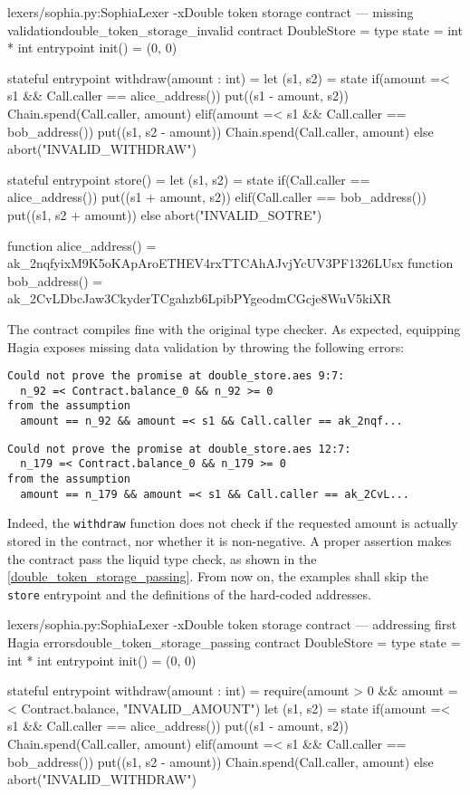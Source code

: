\begin{code}[H]{lexers/sophia.py:SophiaLexer -x}{Double token storage contract --- missing
    validation}{double_token_storage_invalid}
contract DoubleStore =
  type state = int * int
  entrypoint init() = (0, 0)

  stateful entrypoint withdraw(amount : int) =
    let (s1, s2) = state
    if(amount =< s1 && Call.caller == alice_address())
      put((s1 - amount, s2))
      Chain.spend(Call.caller, amount)
    elif(amount =< s1 && Call.caller == bob_address())
      put((s1, s2 - amount))
      Chain.spend(Call.caller, amount)
    else
      abort("INVALID_WITHDRAW")

  stateful entrypoint store() =
    let (s1, s2) = state
    if(Call.caller == alice_address())
      put((s1 + amount, s2))
    elif(Call.caller == bob_address())
      put((s1, s2 + amount))
    else
      abort("INVALID_SOTRE")

  function alice_address() =
    ak_2nqfyixM9K5oKApAroETHEV4rxTTCAhAJvjYcUV3PF1326LUsx
  function bob_address() =
    ak_2CvLDbcJaw3CkyderTCgahzb6LpibPYgeodmCGcje8WuV5kiXR
\end{code}

The contract compiles fine with the original type checker. As expected,
equipping Hagia exposes missing data validation by throwing the following
errors:

\begin{Verbatim}[samepage=true]
Could not prove the promise at double_store.aes 9:7:
  n_92 =< Contract.balance_0 && n_92 >= 0
from the assumption
  amount == n_92 && amount =< s1 && Call.caller == ak_2nqf...
\end{Verbatim}
\begin{Verbatim}[samepage=true]
Could not prove the promise at double_store.aes 12:7:
  n_179 =< Contract.balance_0 && n_179 >= 0
from the assumption
  amount == n_179 && amount =< s1 && Call.caller == ak_2CvL...
\end{Verbatim}

Indeed, the \texttt{withdraw} function does not check if the requested amount is
actually stored in the contract, nor whether it is non-negative. A proper
assertion makes the contract pass the liquid type check, as shown in the
\autoref{double_token_storage_passing}. From now on, the examples shall skip the
\texttt{store} entrypoint and the definitions of the hard-coded addresses.

\begin{code}[H]{lexers/sophia.py:SophiaLexer -x}{Double token storage contract --- addressing
    first Hagia errors}{double_token_storage_passing}
contract DoubleStore =
  type state = int * int
  entrypoint init() = (0, 0)

  stateful entrypoint withdraw(amount : int) =
    require(amount > 0 && amount =< Contract.balance, "INVALID_AMOUNT")
    let (s1, s2) = state
    if(amount =< s1 && Call.caller == alice_address())
      put((s1 - amount, s2))
      Chain.spend(Call.caller, amount)
    elif(amount =< s1 && Call.caller == bob_address())
      put((s1, s2 - amount))
      Chain.spend(Call.caller, amount)
    else
      abort("INVALID_WITHDRAW")
\end{code}

